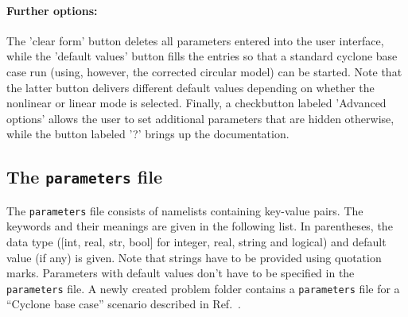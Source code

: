 \documentclass[12pt]{article}
\begin{document}
\paragraph{Further options:}
The 'clear form' button deletes all parameters entered into the user interface, while the 'default 
values' button fills the entries so that a standard cyclone base case run (using, however, the 
corrected circular model) can be started. Note that the latter button delivers different default 
values depending on whether the nonlinear or linear mode is selected. Finally, a checkbutton 
labeled 'Advanced options' allows the user to set additional parameters that are hidden otherwise, 
while the button labeled '?' brings up the \gene documentation.

\newpage
\subsection{The \texttt{parameters} file} \label{subsec:parameters}

The \texttt{parameters} file consists of namelists containing key-value pairs.
The keywords and their meanings are given in the following list.
In parentheses, the data type ([int, real, str, bool] for integer, real, string and logical)
and default value (if any) is given. Note that strings have to be provided using quotation marks.
Parameters with default values don't have to be specified in the \texttt{parameters} file.
A newly created problem folder contains a \texttt{parameters} file for a ``Cyclone base case''
scenario described in Ref.~\cite{cyclone}.
\end{document}
